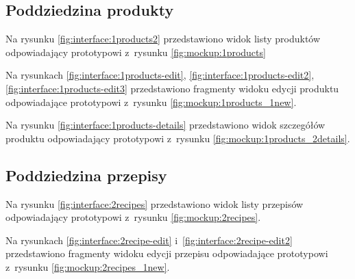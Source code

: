 \subsection{Poddziedzina produkty}

Na rysunku \ref{fig:interface:1products2} przedstawiono widok listy produktów odpowiadający prototypowi z~rysunku \ref{fig:mockup:1products}


Na rysunkach \ref{fig:interface:1products-edit}, \ref{fig:interface:1products-edit2}, \ref{fig:interface:1products-edit3} przedstawiono fragmenty widoku edycji produktu odpowiadające prototypowi z~rysunku \ref{fig:mockup:1products_1new}.




Na rysunku \ref{fig:interface:1products-details} przedstawiono widok szczegółów produktu odpowiadający prototypowi z~rysunku \ref{fig:mockup:1products_2details}.


\subsection{Poddziedzina przepisy}

Na rysunku \ref{fig:interface:2recipes} przedstawiono widok listy przepisów odpowiadający prototypowi z~rysunku \ref{fig:mockup:2recipes}.


Na rysunkach \ref{fig:interface:2recipe-edit} i~\ref{fig:interface:2recipe-edit2} przedstawiono fragmenty widoku edycji przepisu odpowiadające prototypowi z~rysunku \ref{fig:mockup:2recipes_1new}.




